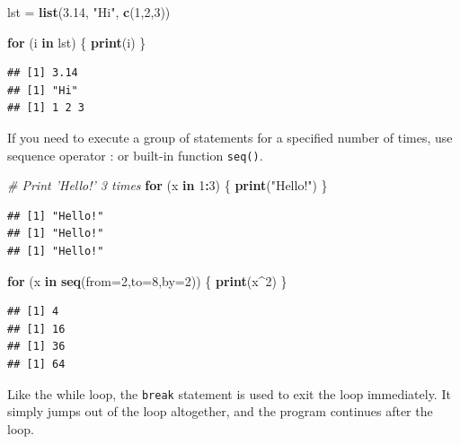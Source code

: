 \documentclass[
]{book}
\newenvironment{Shaded}{\begin{snugshade}}{\end{snugshade}}
\newcommand{\CommentTok}[1]{\textcolor[rgb]{0.56,0.35,0.01}{\textit{#1}}}
\newcommand{\ControlFlowTok}[1]{\textcolor[rgb]{0.13,0.29,0.53}{\textbf{#1}}}
\newcommand{\DataTypeTok}[1]{\textcolor[rgb]{0.13,0.29,0.53}{#1}}
\newcommand{\DecValTok}[1]{\textcolor[rgb]{0.00,0.00,0.81}{#1}}
\newcommand{\FloatTok}[1]{\textcolor[rgb]{0.00,0.00,0.81}{#1}}
\newcommand{\KeywordTok}[1]{\textcolor[rgb]{0.13,0.29,0.53}{\textbf{#1}}}
\newcommand{\NormalTok}[1]{#1}
\newcommand{\OperatorTok}[1]{\textcolor[rgb]{0.81,0.36,0.00}{\textbf{#1}}}
\newcommand{\StringTok}[1]{\textcolor[rgb]{0.31,0.60,0.02}{#1}}
\begin{document}
\begin{Shaded}
\begin{Highlighting}[]
\NormalTok{lst =}\StringTok{ }\KeywordTok{list}\NormalTok{(}\FloatTok{3.14}\NormalTok{, }\StringTok{"Hi"}\NormalTok{, }\KeywordTok{c}\NormalTok{(}\DecValTok{1}\NormalTok{,}\DecValTok{2}\NormalTok{,}\DecValTok{3}\NormalTok{))}

\ControlFlowTok{for}\NormalTok{ (i }\ControlFlowTok{in}\NormalTok{ lst) \{}
  \KeywordTok{print}\NormalTok{(i)}
\NormalTok{\}}
\end{Highlighting}
\end{Shaded}

\begin{verbatim}
## [1] 3.14
## [1] "Hi"
## [1] 1 2 3
\end{verbatim}

If you need to execute a group of statements for a specified number of times, use sequence operator : or built-in function \texttt{seq()}.

\begin{Shaded}
\begin{Highlighting}[]
\CommentTok{# Print 'Hello!' 3 times}
\ControlFlowTok{for}\NormalTok{ (x }\ControlFlowTok{in} \DecValTok{1}\OperatorTok{:}\DecValTok{3}\NormalTok{) \{}
  \KeywordTok{print}\NormalTok{(}\StringTok{"Hello!"}\NormalTok{)}
\NormalTok{\}}
\end{Highlighting}
\end{Shaded}

\begin{verbatim}
## [1] "Hello!"
## [1] "Hello!"
## [1] "Hello!"
\end{verbatim}

\begin{Shaded}
\begin{Highlighting}[]
\ControlFlowTok{for}\NormalTok{ (x }\ControlFlowTok{in} \KeywordTok{seq}\NormalTok{(}\DataTypeTok{from=}\DecValTok{2}\NormalTok{,}\DataTypeTok{to=}\DecValTok{8}\NormalTok{,}\DataTypeTok{by=}\DecValTok{2}\NormalTok{)) \{}
  \KeywordTok{print}\NormalTok{(x}\OperatorTok{^}\DecValTok{2}\NormalTok{)}
\NormalTok{\}}
\end{Highlighting}
\end{Shaded}

\begin{verbatim}
## [1] 4
## [1] 16
## [1] 36
## [1] 64
\end{verbatim}

Like the while loop, the \texttt{break} statement is used to exit the loop immediately. It simply jumps out of the loop altogether, and the program continues after the loop.
\end{document}
